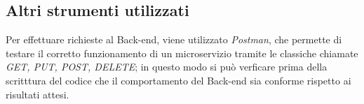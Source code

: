 \subsection{Altri strumenti utilizzati}
Per effettuare richieste al \gls{Back-end}, viene utilizzato \textit{Postman}, che permette di testare il corretto funzionamento di un microservizio tramite le classiche chiamate \textit{GET, PUT, POST, DELETE}; in questo modo si può verficare prima della scritttura del codice che il comportamento del \gls{Back-end} sia conforme rispetto ai risultati attesi.

